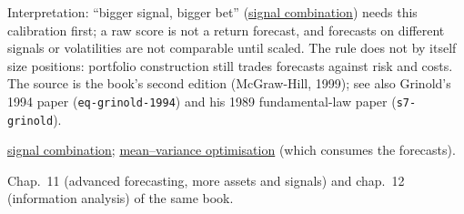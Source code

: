 \begin{qfmethod}[Scaling a raw signal into a return forecast: alpha $=$ volatility $\times$ IC $\times$ score, and combining two correlated signals]
 Interpretation: ``bigger signal, bigger bet'' (\hyperref[meth:alpha-signal-combination]{signal combination}) needs this calibration first; a raw score is not a return forecast, and forecasts on different signals or volatilities are not comparable until scaled. The rule does not by itself size positions: portfolio construction still trades forecasts against risk and costs. The source is the book's second edition (McGraw-Hill, 1999); see also Grinold's 1994 paper (\nolinkurl{eq-grinold-1994}) and his 1989 fundamental-law paper (\nolinkurl{s7-grinold}).

 \hyperref[meth:alpha-signal-combination]{signal combination}; \hyperref[mod:mean-variance-portfolio-optimisation]{mean--variance optimisation} (which consumes the forecasts).

 Chap.~11 (advanced forecasting, more assets and signals) and chap.~12 (information analysis) of the same book.

\end{qfmethod}
